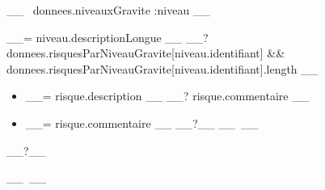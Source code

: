 \documentclass[9pt, a4paper]{article}
\begin{document}
  __~ donnees.niveauxGravite :niveau __
    \begin{tcolorbox}[breakable, colback=white, colframe=lisere, boxrule=1px, bottom=20pt, top=20pt]
      \vspace{-31pt}
      \nopagebreak[4]\singlespacing\textcolor{gris}{__= niveau.descriptionLongue __}
      __? donnees.risquesParNiveauGravite[niveau.identifiant] && donnees.risquesParNiveauGravite[niveau.identifiant].length __
        \begin{itemize}[leftmargin=1.5em]
          __~ donnees.risquesParNiveauGravite[niveau.identifiant] :risque __%
            \item[\textcolor{__= niveau.couleur __}{\textbullet}]
              \vskip 2mm
              __= risque.description __
              __? risque.commentaire __
                \nopagebreak[4]\item[]
                  \vbox{\textcolor{gris}{__= risque.commentaire __}}
                  \vskip 3mm
              __?__%
          __~__%
        \end{itemize}
      __?__
    \end{tcolorbox}
    \vskip 5mm
  __~__
\end{document}
